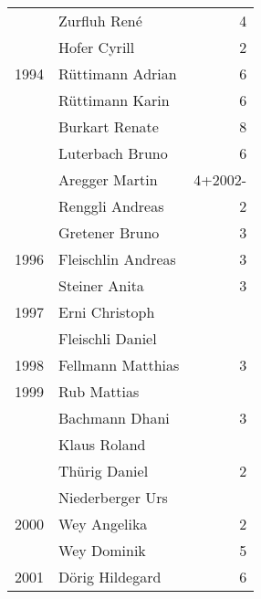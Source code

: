 {\begin{longtable}{ l l r }
                      & Zurfluh René                              & 4           \\
                      & Hofer Cyrill                              & 2           \\
        1994          & Rüttimann Adrian                          & 6           \\
                      & Rüttimann Karin                           & 6           \\
                      & Burkart Renate                            & 8           \\
                      & Luterbach Bruno                           & 6           \\
                      & Aregger Martin                            & 4+2002-     \\
                      & Renggli Andreas                           & 2           \\
                      & Gretener Bruno                            & 3           \\
        1996          & Fleischlin Andreas                        & 3           \\
                      & Steiner Anita                             & 3           \\
        1997          & Erni Christoph                            &             \\
                      & Fleischli Daniel                          &             \\
        1998          & Fellmann Matthias                         & 3           \\
        1999          & Rub Mattias                               &             \\
                      & Bachmann Dhani                            & 3           \\
                      & Klaus Roland                              &             \\
                      & Thürig Daniel                             & 2           \\
                      & Niederberger Urs                          &             \\
        2000          & Wey Angelika                              & 2           \\
                      & Wey Dominik                               & 5           \\
        2001          & Dörig Hildegard                           & 6           \\

\end{longtable}}
